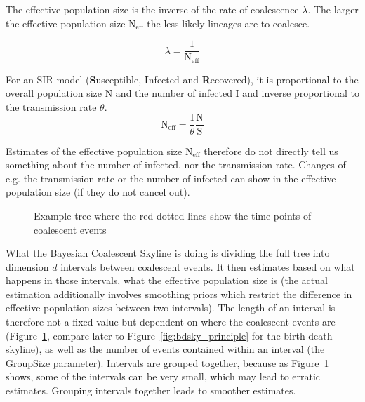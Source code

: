 \documentclass[11pt]{article}
\begin{document}
The effective population size is the inverse of the rate of coalescence $\lambda$. The larger the effective population size N$_{\mathrm{eff}}$ the less likely lineages are to coalesce.

\begin{equation}
\lambda = \frac{1}{\mathrm{N}_{\mathrm{eff}}}
\end{equation} 

For an SIR model (\textbf{S}usceptible, \textbf{I}nfected and \textbf{R}ecovered), it is proportional to the overall population size N and the number of infected I and inverse proportional to the transmission rate $\theta$. 
\begin{equation}
\mathrm{N}_{\mathrm{eff}} = \frac{\mathrm{I}}{\theta} \frac{\mathrm{N}}{\mathrm{S}}
\end{equation} 

Estimates of the effective population size N$_{\mathrm{eff}}$ therefore do not directly tell us something about the number of infected, nor the transmission rate. Changes of e.g. the transmission rate or the number of infected can show in the effective population size (if they do not cancel out).



\begin{figure}[h!]
\centering
{}
\caption{\small Example tree where the red dotted lines show the time-points of coalescent events }
\label{fig:coal_principle}
\end{figure}

What the Bayesian Coalescent Skyline is doing is dividing the full tree into dimension $d$ intervals between coalescent events. It then estimates based on what happens in those intervals, what the effective population size is (the actual estimation additionally involves smoothing priors which restrict the difference in effective population sizes between two intervals). The length of an interval is therefore not a fixed value but dependent on where the coalescent events are (Figure~\ref{fig:coal_principle}, compare later to Figure~\ref{fig:bdsky_principle} for the birth-death skyline), as well as the number of events contained within an interval (the GroupSize parameter). Intervals are grouped together, because as Figure~\ref{fig:coal_principle} shows, some of the intervals can be very small, which may lead to erratic estimates. Grouping intervals together leads to smoother estimates.
\end{document}

